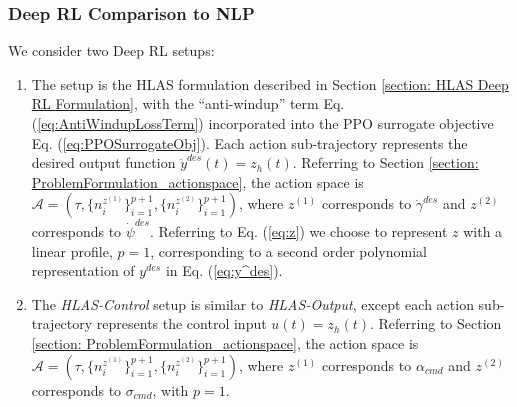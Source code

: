 \documentclass{UnderReview}
\begin{document}
\subsubsection{Deep RL Comparison to NLP}\label{section:NumericalExp_DeepRLComparetoNLP}
We consider two Deep RL setups:
\begin{enumerate}
	\item The \textit{} setup is the HLAS formulation described in Section \ref{section: HLAS Deep RL Formulation}, with the ``anti-windup'' term Eq. (\ref{eq:AntiWindupLossTerm}) incorporated into the PPO surrogate objective Eq. (\ref{eq:PPOSurrogateObj}).  Each action sub-trajectory represents the desired output function $\dot y^{des}(t)=z_h(t)$.  Referring to Section \ref{section: ProblemFormulation_actionspace}, the action space is $\mathcal{A}=(\tau, \{n^{z^{(1)}}_{i}\}_{i=1}^{p+1}, \{n^{z^{(2)}}_{i}\}_{i=1}^{p+1})$, where $z^{(1)}$ corresponds to $\dot \gamma^{des}$ and $z^{(2)}$ corresponds to $\dot \psi^{des}$.  Referring to Eq. (\ref{eq:z}) we choose to represent $z$ with a linear profile, $p=1$, corresponding to a second order polynomial representation of $y^{des}$ in Eq. (\ref{eq:y^des}). 
	\item The \textit{HLAS-Control} setup is similar to \textit{HLAS-Output}, except each action sub-trajectory represents the control input $u(t)=z_h(t)$.  Referring to Section \ref{section: ProblemFormulation_actionspace}, the action space is $\mathcal{A}=(\tau, \{n^{z^{(1)}}_{i}\}_{i=1}^{p+1}, \{n^{z^{(2)}}_{i}\}_{i=1}^{p+1})$, where $z^{(1)}$ corresponds to $\alpha_{cmd}$ and $z^{(2)}$ corresponds to $\sigma_{cmd}$, with $p=1$.  
\end{enumerate}
\end{document}
